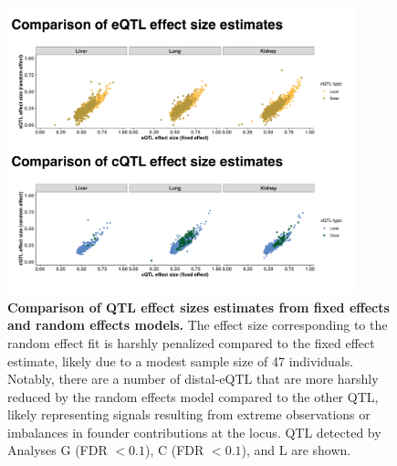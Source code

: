 \documentclass[10pt,letterpaper,twoside]{article}
\begin{document}
\begin{figure}[hp]
\renewcommand{\familydefault}{\sfdefault}\normalfont
\centering
\includegraphics[width=0.9\textwidth, trim={0in 0in 0in 0in}, clip]{figs/fixefvsranef_qtl.pdf}
\caption{\textbf{Comparison of QTL effect sizes estimates from fixed effects and random effects models.} 
The effect size corresponding to the random effect fit is harshly penalized compared to the fixed effect estimate, likely due to a modest sample size of 47 individuals. Notably, there are a number of distal-eQTL that are more harshly reduced by the random effects model compared to the other QTL, likely representing signals resulting from extreme observations or imbalances in founder contributions at the locus. QTL detected by Analyses G (FDR $< 0.1$), C (FDR $< 0.1$), and L are shown.
\label{fig:qtl_effect_size_fixefvsranef}}
\end{figure}
\end{document}
